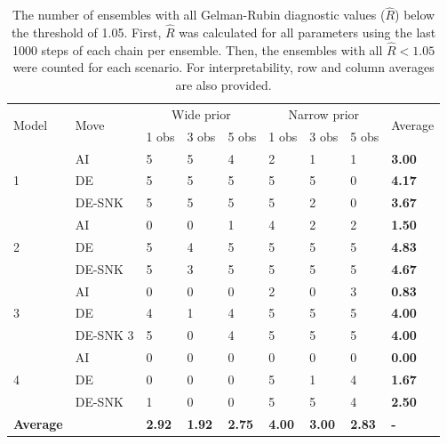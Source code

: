 \begin{table}[ht]
\centering
\caption{The number of ensembles with all Gelman-Rubin diagnostic values ($\hat{R}$) below the threshold of 1.05. First, $\hat{R}$ was calculated for all parameters using the last 1000 steps of each chain per ensemble. Then, the ensembles with all $\hat{R} < 1.05$ were counted for each scenario. For interpretability, row and column averages are also provided.}
\label{tab_rhat_mean}
\begin{tabularx}{\textwidth}{llXXXXXXX}
\toprule
\multirow{2}{*}{Model} & \multirow{2}{*}{Move} & \multicolumn{3}{c}{Wide prior} & \multicolumn{3}{c}{Narrow prior} & \multirow{2}{*}{Average}\\
\cmidrule(lr){3-5} \cmidrule(lr){6-8}
& & 1 obs & 3 obs & 5 obs & 1 obs & 3 obs & 5 obs & \\
\midrule
\multirow{3}{*}{1} & AI & 5 & 5 & 4 & 2 & 1 & 1 & \textbf{3.00} \\
& DE & 5 & 5 & 5 & 5 & 5 & 0 & \textbf{4.17} \\
& DE-SNK & 5 & 5 & 5 & 5 & 2 & 0 & \textbf{3.67} \\
\cmidrule(lr){1-2} \cmidrule(lr){3-5} \cmidrule(lr){6-8} \cmidrule(lr){9-9}
\multirow{3}{*}{2} & AI & 0 & 0 & 1 & 4 & 2 & 2 & \textbf{1.50} \\
& DE & 5 & 4 & 5 & 5 & 5 & 5 & \textbf{4.83} \\
& DE-SNK & 5 & 3 & 5 & 5 & 5 & 5 & \textbf{4.67} \\
\cmidrule(lr){1-2} \cmidrule(lr){3-5} \cmidrule(lr){6-8} \cmidrule(lr){9-9}
\multirow{3}{*}{3} & AI & 0 & 0 & 0 & 2 & 0 & 3 & \textbf{0.83} \\
& DE & 4 & 1 & 4 & 5 & 5 & 5 & \textbf{4.00} \\
& DE-SNK 3 & 5 & 0 & 4 & 5 & 5 & 5 & \textbf{4.00} \\
\cmidrule(lr){1-2} \cmidrule(lr){3-5} \cmidrule(lr){6-8} \cmidrule(lr){9-9}
\multirow{3}{*}{4} & AI & 0 & 0 & 0 & 0 & 0 & 0 & \textbf{0.00} \\
& DE & 0 & 0 & 0 & 5 & 1 & 4 & \textbf{1.67} \\
& DE-SNK & 1 & 0 & 0 & 5 & 5 & 4 & \textbf{2.50} \\
\midrule
\textbf{Average} & & \textbf{2.92} & \textbf{1.92} & \textbf{2.75} & \textbf{4.00} & \textbf{3.00} & \textbf{2.83} & \textbf{-} \\
\bottomrule
\end{tabularx}
\end{table}

